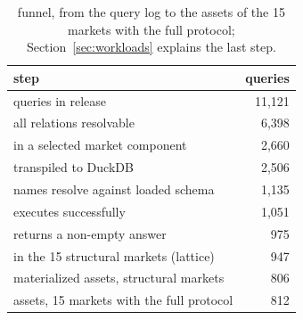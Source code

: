 
\begin{table}[t]
  \centering
  \small
  \caption{\sqlshare{} funnel, from the query log to the assets of the 15 markets with the full protocol; Section~\ref{sec:workloads} explains the last step.}
  \label{tab:funnel}
  \begin{tabular}{@{}p{}r@{}}
    \toprule
    step & queries \\
    \midrule
    queries in release & 11,121 \\
    all relations resolvable & 6,398 \\
    in a selected market component & 2,660 \\
    transpiled to DuckDB & 2,506 \\
    names resolve against loaded schema & 1,135 \\
    executes successfully & 1,051 \\
    returns a non-empty answer & 975 \\
    in the 15 structural markets (lattice) & 947 \\
    materialized assets, structural markets & 806 \\
    assets, 15 markets with the full protocol & 812 \\
    \bottomrule
  \end{tabular}
\end{table}
